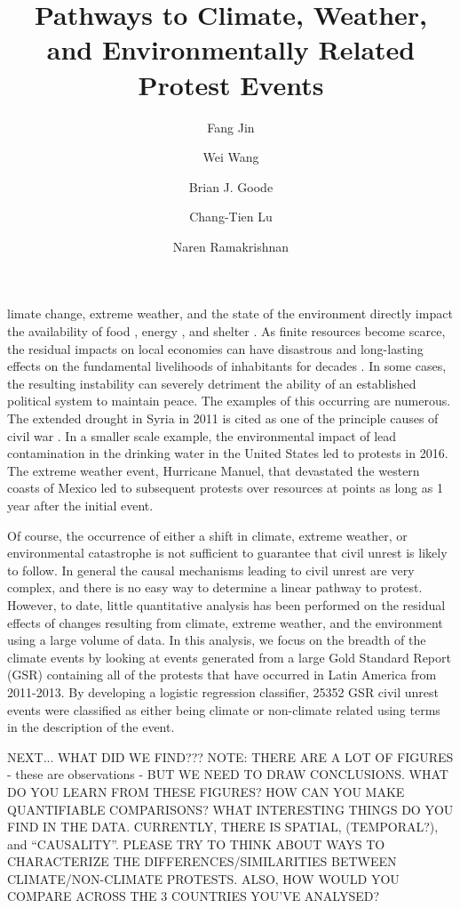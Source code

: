 \documentclass[9pt,twocolumn,twoside]{pnas-new}
\title{Pathways to Climate, Weather, and Environmentally Related Protest Events}
\author[a,1]{Fang Jin}
\author[a]{Wei Wang}
\author[a]{Brian J. Goode}
\author[a]{Chang-Tien Lu}
\author[a]{Naren Ramakrishnan}
\affil[a]{Discovery Analytics Center (Dept. of Computer Science), Virginia Tech - NCR, Arlington, VA 22203}
\begin{document}
\verticaladjustment{-2pt}

\maketitle
\thispagestyle{firststyle}
limate change, extreme weather, and the state of the environment directly impact the availability of food \cite{RW3}, energy \cite{}, and shelter \cite{}.
As finite resources become scarce, the residual impacts on local economies can have disastrous and long-lasting effects on the fundamental livelihoods of inhabitants for decades \cite{}.
In some cases, the resulting instability can severely detriment the ability of an established political system to maintain peace.
The examples of this occurring are numerous.
The extended drought in Syria in 2011 is cited as one of the principle causes of civil war \cite{gleick2014water,kelley2015climate}.
In a smaller scale example, the environmental impact of lead contamination in the drinking water in the United States led to protests in 2016.
The extreme weather event, Hurricane Manuel, that devastated the western coasts of Mexico led to subsequent protests over resources at points as long as 1 year after the initial event.

Of course, the occurrence of either a shift in climate, extreme weather, or environmental catastrophe is not sufficient to guarantee that civil unrest is likely to follow.
In general the causal mechanisms leading to civil unrest are very complex, and there is no easy way to determine a linear pathway to protest.
However, to date, little quantitative analysis has been performed on the residual effects of changes resulting from climate, extreme weather, and the environment using a large volume of data.
In this analysis, we focus on the breadth of the climate events by looking at events generated from a large Gold Standard Report (GSR) containing all of the protests that have occurred in Latin America from 2011-2013.
By developing a logistic regression classifier, 25352 GSR civil unrest events were classified as either being climate or non-climate related using terms in the description of the event.


NEXT... WHAT DID WE FIND???
{\color{red}
NOTE: THERE ARE A LOT OF FIGURES - these are observations - BUT WE NEED TO DRAW CONCLUSIONS. WHAT DO YOU LEARN FROM THESE FIGURES? HOW CAN YOU MAKE QUANTIFIABLE COMPARISONS? WHAT INTERESTING THINGS DO YOU FIND IN THE DATA. CURRENTLY, THERE IS SPATIAL, (TEMPORAL?), and ``CAUSALITY''. PLEASE TRY TO THINK ABOUT WAYS TO CHARACTERIZE THE DIFFERENCES/SIMILARITIES BETWEEN CLIMATE/NON-CLIMATE PROTESTS. ALSO, HOW WOULD YOU COMPARE ACROSS THE 3 COUNTRIES YOU'VE ANALYSED?}
\end{document}
